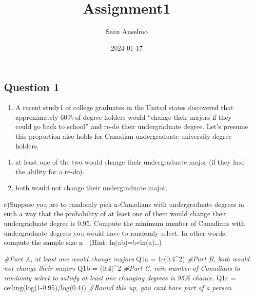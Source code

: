 \documentclass[
]{article}
\title{Assignment1}
\author{Sean Anselmo}
\date{2024-01-17}
\newenvironment{Shaded}{\begin{snugshade}}{\end{snugshade}}
\newcommand{\CommentTok}[1]{\textcolor[rgb]{0.56,0.35,0.01}{\textit{#1}}}
\newcommand{\DecValTok}[1]{\textcolor[rgb]{0.00,0.00,0.81}{#1}}
\newcommand{\FloatTok}[1]{\textcolor[rgb]{0.00,0.00,0.81}{#1}}
\newcommand{\FunctionTok}[1]{\textcolor[rgb]{0.00,0.00,0.00}{#1}}
\newcommand{\NormalTok}[1]{#1}
\newcommand{\OtherTok}[1]{\textcolor[rgb]{0.56,0.35,0.01}{#1}}
\newcommand{\SpecialCharTok}[1]{\textcolor[rgb]{0.00,0.00,0.00}{#1}}
\providecommand{\tightlist}{%
  \setlength{\itemsep}{0pt}\setlength{\parskip}{0pt}}
\begin{document}
\maketitle

\hypertarget{question-1}{%
\subsection{Question 1}\label{question-1}}

\begin{enumerate}
\def\labelenumi{\arabic{enumi}.}
\tightlist
\item
  A recent study1 of college graduates in the United states discovered
  that approximately 60\% of degree holders would ``change their majors
  if they could go back to school'' and re-do their undergraduate
  degree. Let's presume this proportion also holds for Canadian
  undergraduate university degree holders.
\end{enumerate}

\begin{enumerate}
\def\labelenumi{\alph{enumi})}
\item
  at least one of the two would change their undergraduate major (if
  they had the ability for a re-do).
\item
  both would not change their undergraduate major.
\end{enumerate}

c)Suppose you are to randomly pick n-Canadians with undergraduate
degrees in such a way that the probability of at least one of them would
change their undergraduate degree is 0.95. Compute the minimum number of
Canadians with undergraduate degrees you would have to randomly select.
In other words, compute the sample size n . (Hint: ln(ab)=b∗ln(a)\ldots)

\begin{Shaded}
\begin{Highlighting}[]
\CommentTok{\#Part A, at least one would change majors}
\NormalTok{Q1a }\OtherTok{=} \DecValTok{1}\SpecialCharTok{{-}}\NormalTok{(}\FloatTok{0.4}\SpecialCharTok{\^{}}\DecValTok{2}\NormalTok{)}
\CommentTok{\#Part B, both would not change their majors}
\NormalTok{Q1b }\OtherTok{=}\NormalTok{ (}\FloatTok{0.4}\NormalTok{)}\SpecialCharTok{\^{}}\DecValTok{2}
\CommentTok{\#Part C, min number of Canadians to randomly select to satisfy at least one changing degrees is 95\% chance.}
\NormalTok{Q1c }\OtherTok{=} \FunctionTok{ceiling}\NormalTok{(}\FunctionTok{log}\NormalTok{(}\DecValTok{1}\FloatTok{{-}0.95}\NormalTok{)}\SpecialCharTok{/}\FunctionTok{log}\NormalTok{(}\FloatTok{0.4}\NormalTok{)) }\CommentTok{\#Round this up, you can\textquotesingle{}t have part of a person}
\end{Highlighting}
\end{Shaded}
\end{document}
